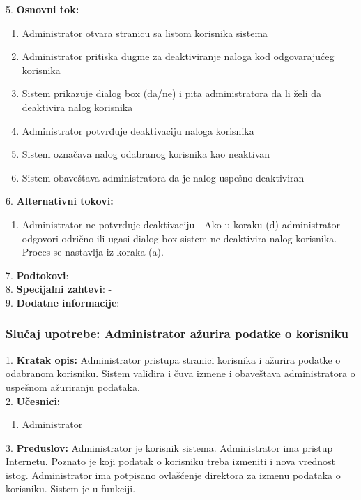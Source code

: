 \documentclass{article}
\begin{document}
5. \textbf{Osnovni tok:} 
\begin{enumerate} [label=(\alph*)]
\item Administrator otvara stranicu sa listom korisnika sistema
\item Administrator pritiska dugme za deaktiviranje naloga kod odgovarajućeg korisnika
\item Sistem prikazuje dialog box (da/ne) i pita administratora da li želi da deaktivira nalog korisnika
\item Administrator potvrđuje deaktivaciju naloga korisnika
\item Sistem označava nalog odabranog korisnika kao neaktivan
\item Sistem obaveštava administratora da je nalog uspešno deaktiviran
\end{enumerate}

6. \textbf{Alternativni tokovi:}
\begin{enumerate} [label=(\roman*)]
    \item Administrator ne potvrđuje deaktivaciju - Ako u koraku (d) administrator odgovori odrično ili ugasi dialog box sistem ne deaktivira nalog korisnika. Proces se nastavlja iz koraka (a).
\end{enumerate}

7. \textbf{Podtokovi}: - \\

8. \textbf{Specijalni zahtevi}: - \\

9. \textbf{Dodatne informacije}: - \\

\subsubsection{Slučaj upotrebe: Administrator ažurira podatke o korisniku}
1. \textbf{Kratak opis:} Administrator pristupa stranici korisnika i ažurira podatke o odabranom korisniku. Sistem validira i čuva izmene i obaveštava administratora o uspešnom ažuriranju podataka. \\

2. \textbf{Učesnici:}
\begin{enumerate} [label=(\alph*)]
\item Administrator
\end{enumerate} 

3. \textbf{Preduslov:} Administrator je korisnik sistema. Administrator ima pristup Internetu. Poznato je koji podatak o korisniku treba izmeniti i nova vrednost istog. Administrator ima potpisano ovlašćenje direktora za izmenu podataka o korisniku. Sistem je u funkciji. \\
\end{document}
